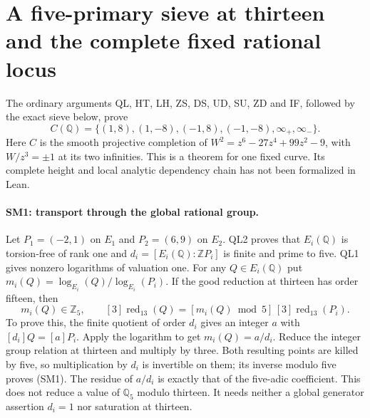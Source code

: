 \section{A five-primary sieve at thirteen and the complete fixed rational locus}
\label{sec-fixed-rational-locus}

The ordinary arguments QL, HT, LH, ZS, DS, UD, SU, ZD and IF, followed
by the exact sieve below, prove
\[
 C(\mathbb Q)=\{(1,8),(1,-8),(-1,8),(-1,-8),\infty_+,\infty_-\}.
\]
Here $C$ is the smooth projective completion of
$W^2=z^6-27z^4+99z^2-9$, with $W/z^3=\pm1$ at its two infinities.
This is a theorem for one fixed curve. Its complete height and local
analytic dependency chain has not been formalized in Lean.

\paragraph{SM1: transport through the global rational group.}
Let $P_1=(-2,1)$ on $E_1$ and $P_2=(6,9)$ on $E_2$.
QL2 proves that $E_i(\mathbb Q)$ is torsion-free of rank one and
$d_i=[E_i(\mathbb Q):\mathbb ZP_i]$ is finite and prime to five.
QL1 gives nonzero logarithms of valuation one. For any
$Q\in E_i(\mathbb Q)$ put $m_i(Q)=\log_{E_i}(Q)/\log_{E_i}(P_i)$.
If the good reduction at thirteen has order fifteen, then
\[
 m_i(Q)\in\mathbb Z_5,\qquad
 [3]\operatorname{red}_{13}(Q)
 =[m_i(Q)\bmod5]\,[3]\operatorname{red}_{13}(P_i).
 \tag{SM1}
\]
To prove this, the finite quotient of order $d_i$ gives an integer
$a$ with $[d_i]Q=[a]P_i$. Apply the logarithm to get $m_i(Q)=a/d_i$.
Reduce the integer group relation at thirteen and multiply by three.
Both resulting points are killed by five, so multiplication by $d_i$
is invertible on them; its inverse modulo five proves (SM1).
The residue of $a/d_i$ is exactly that of the five-adic coefficient.
This does not reduce a value of $\mathbb Q_5$ modulo thirteen.
It needs neither a global generator assertion $d_i=1$ nor saturation
at thirteen.

